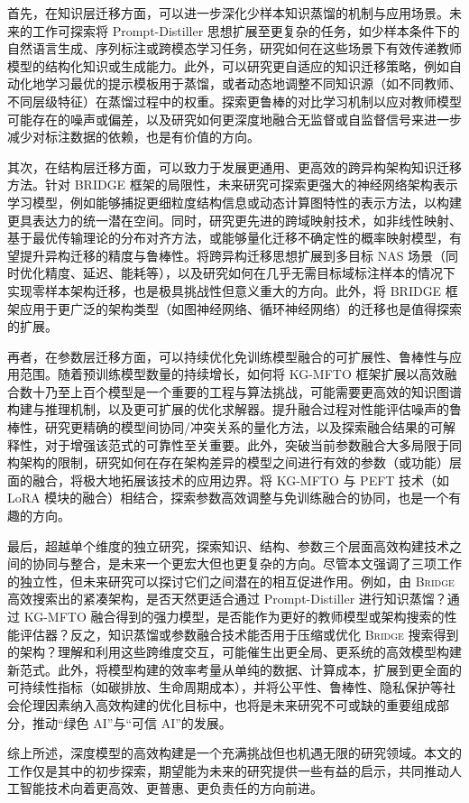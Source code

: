 \documentclass[../main.tex]{subfiles}
\begin{document}
首先，在知识层迁移方面，可以进一步深化少样本知识蒸馏的机制与应用场景。未来的工作可探索将 Prompt-Distiller 思想扩展至更复杂的任务，如少样本条件下的自然语言生成、序列标注或跨模态学习任务，研究如何在这些场景下有效传递教师模型的结构化知识或生成能力。此外，可以研究更自适应的知识迁移策略，例如自动化地学习最优的提示模板用于蒸馏，或者动态地调整不同知识源（如不同教师、不同层级特征）在蒸馏过程中的权重。探索更鲁棒的对比学习机制以应对教师模型可能存在的噪声或偏差，以及研究如何更深度地融合无监督或自监督信号来进一步减少对标注数据的依赖，也是有价值的方向。

其次，在结构层迁移方面，可以致力于发展更通用、更高效的跨异构架构知识迁移方法。针对 BRIDGE 框架的局限性，未来研究可探索更强大的神经网络架构表示学习模型，例如能够捕捉更细粒度结构信息或动态计算图特性的表示方法，以构建更具表达力的统一潜在空间。同时，研究更先进的跨域映射技术，如非线性映射、基于最优传输理论的分布对齐方法，或能够量化迁移不确定性的概率映射模型，有望提升异构迁移的精度与鲁棒性。将跨异构迁移思想扩展到多目标 NAS 场景（同时优化精度、延迟、能耗等），以及研究如何在几乎无需目标域标注样本的情况下实现零样本架构迁移，也是极具挑战性但意义重大的方向。此外，将 BRIDGE 框架应用于更广泛的架构类型（如图神经网络、循环神经网络）的迁移也是值得探索的扩展。

再者，在参数层迁移方面，可以持续优化免训练模型融合的可扩展性、鲁棒性与应用范围。随着预训练模型数量的持续增长，如何将 KG-MFTO 框架扩展以高效融合数十乃至上百个模型是一个重要的工程与算法挑战，可能需要更高效的知识图谱构建与推理机制，以及更可扩展的优化求解器。提升融合过程对性能评估噪声的鲁棒性，研究更精确的模型间协同/冲突关系的量化方法，以及探索融合结果的可解释性，对于增强该范式的可靠性至关重要。此外，突破当前参数融合大多局限于同构架构的限制，研究如何在存在架构差异的模型之间进行有效的参数（或功能）层面的融合，将极大地拓展该技术的应用边界。将 KG-MFTO 与 PEFT 技术（如 LoRA 模块的融合）相结合，探索参数高效调整与免训练融合的协同，也是一个有趣的方向。

最后，超越单个维度的独立研究，探索知识、结构、参数三个层面高效构建技术之间的协同与整合，是未来一个更宏大但也更复杂的方向。尽管本文强调了三项工作的独立性，但未来研究可以探讨它们之间潜在的相互促进作用。例如，由 \textsc{Bridge} 高效搜索出的紧凑架构，是否天然更适合通过 Prompt-Distiller 进行知识蒸馏？通过 KG-MFTO 融合得到的强力模型，是否能作为更好的教师模型或架构搜索的性能评估器？反之，知识蒸馏或参数融合技术能否用于压缩或优化 \textsc{Bridge} 搜索得到的架构？理解和利用这些跨维度交互，可能催生出更全局、更系统的高效模型构建新范式。此外，将模型构建的效率考量从单纯的数据、计算成本，扩展到更全面的可持续性指标（如碳排放、生命周期成本），并将公平性、鲁棒性、隐私保护等社会伦理因素纳入高效构建的优化目标中，也将是未来研究不可或缺的重要组成部分，推动“绿色 AI”与“可信 AI”的发展。

综上所述，深度模型的高效构建是一个充满挑战但也机遇无限的研究领域。本文的工作仅是其中的初步探索，期望能为未来的研究提供一些有益的启示，共同推动人工智能技术向着更高效、更普惠、更负责任的方向前进。
\end{document}
